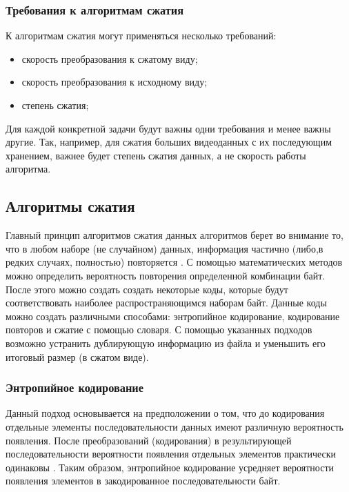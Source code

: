 \subsubsection{Требования к алгоритмам сжатия}

К алгоритмам сжатия могут применяться несколько требований:

\begin{itemize}
	\item скорость преобразования к сжатому виду;
	\item скорость преобразования к исходному виду;
	\item степень сжатия;
\end{itemize}

Для каждой конкретной задачи будут важны одни требования и менее важны другие. Так, например, для сжатия больших видеоданных с их последующим хранением, важнее будет степень сжатия данных, а не скорость работы алгоритма.

\subsection{Алгоритмы сжатия}

Главный принцип алгоритмов сжатия данных алгоритмов берет во внимание то, что в любом наборе (не случайном) данных, информация частично (либо,в редких случаях, полностью) повторяется \cite{lossless-compression}. С помощью математических методов можно определить вероятность повторения определенной комбинации байт. После этого можно создать создать некоторые коды, которые будут соответствовать наиболее распространяющимся наборам байт. Данные коды можно создать различными способами: энтропийное кодирование, кодирование повторов и сжатие с помощью словаря. С помощью указанных подходов возможно устранить дублирующую информацию из файла и уменьшить его итоговый размер (в сжатом виде). 

\subsubsection{Энтропийное кодирование}

Данный подход основывается на предположении о том, что до кодирования отдельные элементы последовательности данных имеют различную вероятность появления. После преобразований (кодирования) в результирующей последовательности вероятности появления отдельных элементов практически одинаковы \cite{lossless-compression}. Таким образом, энтропийное кодирование усредняет вероятности появления элементов в закодированное последовательности байт.

